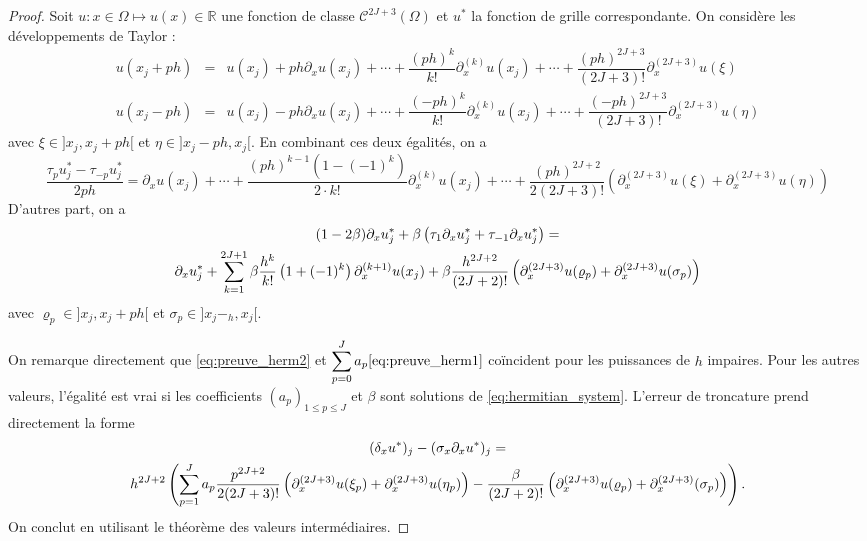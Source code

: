 \begin{proof}
Soit $u : x \in \Omega \mapsto u(x) \in \mathbb{R}$ une fonction de classe $\mathcal{C}^{2J+3}( \Omega)$ et $u^*$ la fonction de grille correspondante.
On considère les développements de Taylor :
\begin{equation}
\begin{array}{rcl}
u(x_j + ph) & = & u(x_j) + p h \partial_x u(x_j) + \cdots + \dfrac{(ph)^k}{k!}\partial_x^{(k)}u(x_j) + \cdots +\dfrac{(ph)^{2J+3}}{(2J+3)!} \partial_x^{(2J+3)}u(\xi)\\
u(x_j - ph) & = & u(x_j) - p h \partial_x u(x_j) + \cdots + \dfrac{(-ph)^k}{k!}\partial_x^{(k)} u(x_j) + \cdots +\dfrac{(-ph)^{2J+3}}{(2J+3)!} \partial_x^{(2J+3)}u(\eta)
\end{array}
\end{equation}
avec $\xi \in ]x_j, x_j+ph[$ et $\eta \in ]x_j-ph, x_j[$. En combinant ces deux égalités, on a
\begin{equation}
\dfrac{\tau_p u^*_j - \tau_{-p} u^*_j}{2ph} = \partial_x u(x_j) + \cdots + \dfrac{(ph)^{k-1}(1 - (-1)^k)}{2 \cdot k!} \partial_x^{(k)}u(x_j) + \cdots +\dfrac{(ph)^{2J+2}}{2(2J+3)!} \left( \partial_x^{(2J+3)}u(\xi) + \partial_x^{(2J+3)}u(\eta) \right)
\label{eq:preuve_herm1}
\end{equation}
D'autres part, on a 
\begin{multline}
(1-2\beta) \partial_x u^*_j + \beta \left( \tau_1 \partial_xu^*_{j} + \tau_{-1} \partial_xu^*_{j} \right) = \\
 \partial_x u^*_j +  \displaystyle\sum\limits_{k=1}^{2J+1} \beta \dfrac{h^{k}}{k!} \left( 1 + (-1)^k \right) \partial_x^{(k+1)}u(x_j)+ \beta \dfrac{h^{2J+2}}{(2J+2)!} \left(\partial_x^{(2J+3)}u(\varrho_p) + \partial_x^{(2J+3)}u(\sigma_p) \right) 
\label{eq:preuve_herm2}
\end{multline}
avec $\varrho_p \in ]x_j, x_j + ph[$ et $\sigma_p \in ]x_j - _h , x_j[$. 

On remarque directement que \eqref{eq:preuve_herm2} et $\displaystyle\sum\limits_{p=0}^J a_p  \eqref{eq:preuve_herm1}$ coïncident pour les puissances de $h$ impaires. 
Pour les autres valeurs, l'égalité est vrai si les coefficients $(a_p)_{1 \leq p \leq J}$ et $\beta$ sont solutions de \eqref{eq:hermitian_system}. L'erreur de troncature prend directement la forme 
\begin{multline}
(\delta_{x} u^*)_j - (\sigma_{x} \partial_x u^*)_j = \\
h^{2J+2} \left( \displaystyle\sum\limits_{p=1}^J a_p  \dfrac{p^{2J+2}}{2(2J+3)!} \left( \partial_x^{(2J+3)}u(\xi_p) + \partial_x^{(2J+3)}u(\eta_p) \right) - \dfrac{\beta}{(2J+2)!} \left(\partial_x^{(2J+3)}u(\varrho_p) + \partial_x^{(2J+3)}(\sigma_p) \right) \right).
\end{multline}
On conclut en utilisant le théorème des valeurs intermédiaires.
\end{proof}

